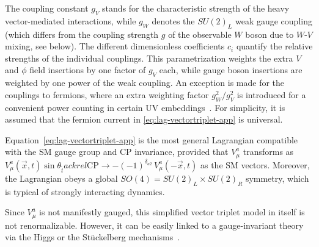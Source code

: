 The coupling constant $g_V$ stands for the characteristic strength of
the heavy vector-mediated interactions, while $g_W$ denotes the
$SU(2)_L$ weak gauge coupling (which differs from the coupling
strength $g$ of the observable $W$ boson due to $W$-$V$ mixing, see
below).  The different
dimensionless coefficients $c_i$ quantify the relative strengths of
the individual couplings.  This parametrization weights the extra $V$
and $\phi$ field insertions by one factor of $g_V$ each, while gauge
boson insertions are weighted by one power of the weak coupling.  An
exception is made for the couplings to fermions, where an extra
weighting factor $g_W^2/g_V^2$ is introduced for a convenient power
counting in certain UV embeddings~\cite{Pappadopulo:2014qza}.  For
simplicity, it is assumed that the fermion current in
\autoref{eq:lag-vectortriplet-app} is universal.

Equation~\eqref{eq:lag-vectortriplet-app} is the most general Lagrangian
compatible with the SM gauge group and CP invariance, provided that
$V_\mu^a$ transforms as $V_\mu^a(\vec{x},t)
\sin\theta_{\tilde{t}}ackrel{\text{CP}}{\longrightarrow}
-(-1)^{\delta_{a2}}\,V_\mu^a(-\vec{x},t)$ as the SM vectors. 
Moreover, the Lagrangian obeys a
global $SO(4) = SU(2)_L \times SU(2)_R$ symmetry, which is typical of
strongly interacting dynamics.

Since $V_\mu^a$ is not manifestly gauged, this simplified vector
triplet model in itself is not renormalizable.  However, it can be
easily linked to a gauge-invariant theory \eg via the Higgs or the
St\"uckelberg mechanisms~\cite{Pappadopulo:2014qza}.

